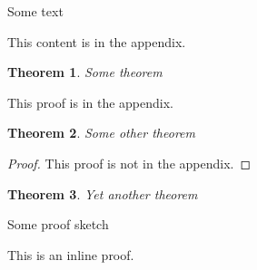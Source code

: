 \documentclass{article}
\newtheorem{theorem}{Theorem}
\begin{document}
Some text
\begin{toappendix}
This content is in the appendix.
\end{toappendix}
\begin{theorem}
Some theorem
\end{theorem}
\begin{appendixproof}
This proof is in the appendix.
\end{appendixproof}
\begin{theorem}
Some other theorem
\end{theorem}
\begin{proof}
This proof is not in the appendix.
\end{proof}
\begin{theorem}
Yet another theorem
\end{theorem}
\begin{proofsketch}
Some proof sketch
\end{proofsketch}
\begin{inlineproof}
This is an inline proof.
\end{inlineproof}
\end{document}
